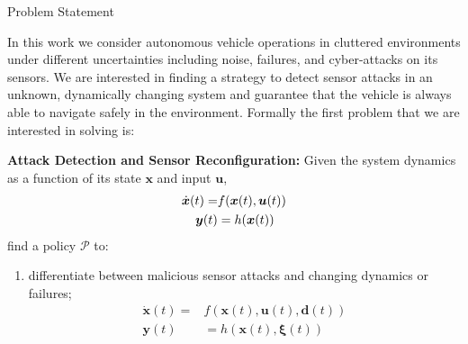 
\begin{section}{Problem Statement}
	
\label{sec:problem}

In this work we consider autonomous vehicle operations in cluttered environments under different uncertainties including noise, failures, and cyber-attacks on its sensors. 
We are interested in finding a strategy to detect sensor attacks in an unknown, dynamically changing system and guarantee that the vehicle is always able to navigate safely in the environment. 
Formally the first problem that we are interested in solving is:
\begin{problem} 
\label{problem1} {\textbf{Attack Detection and Sensor Reconfiguration:}} 
 Given the system dynamics as a function of its state $ \bm{x} $ and input $ \bm{u}$,
 \vspace{-10pt}
	\begin{equation}
	\begin{split}
		\dot{\bm{x}}(t) =& f(\bm{x}(t), \bm{u}(t)) \\
		\bm{y}(t)&=h(\bm{x}(t))
    \end{split}
    	 \vspace{-10pt}
	\end{equation}
find a policy $\mathcal{P}$ to:
\begin{enumerate}
	\item differentiate between malicious sensor attacks and changing dynamics or failures; 
	\begin{equation}
	\begin{split}
	\label{eq:detect_attack}
	    \dot{\bm{x}}(t) = &f(\bm{x}(t), \bm{u}(t), \bm{d}(t)) \\
	    \bm{y}(t)&=h(\bm{x}(t), \bm{\xi}(t))
	\end{split}    

\end{equation}
\end{enumerate}
\end{problem}
\end{section}

